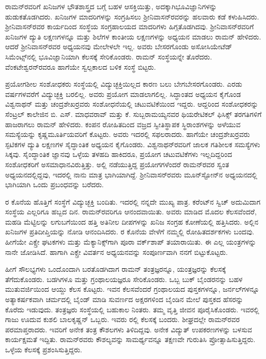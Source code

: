 ರಾಮನ್‍ರವರಿಗೆ ಖನಿಜಗಳ ಭೌತಶಾಸ್ತ್ರದ ಬಗ್ಗೆ ಬಹಳ ಆಸಕ್ತಿಯಿತ್ತು, ಅದಕ್ಕಾಗಿ\break ಭೂವಿಜ್ಞಾನಿಗಳನ್ನು ಹುಡುಕತೊಡಗಿದರು. ಖನಿಜಗಳ ಮಾದರಿಗಳನ್ನು ಸಂಗ್ರಹಿಸಲು ಶ‍್ರೀನಿವಾಸನ್‍\-ರವರನ್ನು ಹಲವಾರು ಕಡೆ ಕಳುಹಿಸಿದರು. ಶ‍್ರೀನಿವಾಸನ್‍ರವರ ಕಾರ್ಯದಿಂದ ಸಂಸ್ಥೆಯ ಸಂಗ್ರಹಾಲಯದ ಮಾದರಿಗಳು ಹಿಗ್ಗತೊಡಗಿದವು. ಶ‍್ರೀನಿವಾಸನ್‍ರವರಿಗೆ ಖನಿಜಗಳ ದ್ಯುತಿ ಲಕ್ಷಣಗಳನ್ನೂ ಮತ್ತು ಶಿಲೆಗಳ ಕಾಂತೀಯ ಲಕ್ಷಣಗಳನ್ನು ಅಧ್ಯಯನ ಮಾಡಲು ರಾಮನ್ ಹೇಳಿದರು. ಆದರೆ ಶ‍್ರೀನಿವಾಸನ್‍ರವರ ಅಧ್ಯಯನವು ಮೇಲೇಳಲೇ ಇಲ್ಲ. ಅವರು ಬೇಸರಗೊಂಡು ಅಸೋಸಿಯೇಟೆಡ್ ಸಿಮೆಂಟ್ಸ್‌ನಲ್ಲಿ ಭೂವಿಜ್ಞಾನಿಯಾಗಿ ಕೆಲಸಕ್ಕೆ ಸೇರಿಕೊಂಡರು. ರಾಮನ್ ಸಂಸ್ಥೆಯನ್ನೇ ತೊರೆದರು. ವೆಂಕಟೇಶ್ವರನ್‍ರವರೂ ಹಾಗೆಯೇ ಸ್ವಲ್ಪಕಾಲದ ಬಳಿಕ ಸಂಸ್ಥೆ ಬಿಟ್ಟರು.

ಪ್ರಯೋಗಶೀಲ ಸಂಶೋಧಕರು ಸಂಸ್ಥೆಯಲ್ಲಿ ವಿದ್ಯುಚ್ಛಕ್ತಿಯಿಲ್ಲದ ಕಾರಣ ಬಲು ಬೇಗ\break ಬೇಸರಗೊಂಡರು. ಎರಡು ವರ್ಷಗಳವರೆಗೆ ವಿದ್ಯುಚ್ಛಕ್ತಿ ಬರಲಿಲ್ಲ. ಅವರು ಪ್ರಯೋಗ ಮಾಡಲಾಗಲಿಲ್ಲ. ಸಿದ್ಧಾಂತದ ಅಧ್ಯಯನ ಕೈಗೊಂಡ ವಿಶ್ವನಾಥನ್ ಮತ್ತು ಚಂದ್ರಶೇಖರ್‍ರವರು ಸಂಶೋಧನೆಯಲ್ಲಿ ಚಟುವಟಿಕೆಯಿಂದ ಇದ್ದರು. ಆದ್ದರಿಂದ ಸಂಶೋಧಕರನ್ನು ಸೆಂಟ್ರಲ್ ಕಾಲೇಜಿನ ಬಿ. ಎಸ್. ಮಾಧವರಾವ್ ಮತ್ತು ಕೆ. ಸುಬ್ಬರಾಮಯ್ಯನವರ ಥಿಯರೇಟಿಕಲ್ ಫಿಸಿಕ್ಸ್ ತರಗತಿಗಳಿಗೆ ಹಾಜರಾಗಲು ರಾಮನ್ ಹೇಳಿದರು. ಕಂಪನ ರೋಹಿತದಿಂದ ವಜ್ರದ ಸ್ವೀತಿಸ್ಥಾಪಕ ಸ್ಥಿರಾಂಶಗಳನ್ನು ಅಳೆಯುವ ಸಮಸ್ಯೆಯನ್ನು ಕೃಷ್ಣಮೂರ್ತಿಯವರಿಗೆ ಕೊಟ್ಟರು. ಅವರು ಇದರಲ್ಲಿ ಸಫಲರಾದರು. ಹಾಗೆಯೇ ಚಂದ್ರಶೇಖರ್‍ರವರು ಸ್ಫಟಿಕಗಳ ದ್ಯುತಿ ಲಕ್ಷಣಗಳ ಸೈದ್ಧಾಂತಿಕ ಅಧ್ಯಯನ ಕೈಗೊಂಡರು. ವಿಶ್ವನಾಥನ್‍ರವರಿಗೆ ಜಾಲಕ ಗತಿಶೀಲಕ ಸಮಸ್ಯೆಗಳು ಸಿಕ್ಕವು. ಸೈಂದ್ಧಾಂತಿಕ ಜ್ಞಾನವು ಒಳ್ಳೆಯ ತಳಹದಿ ಹಾಕಿದರೂ, ಪ್ರಯೋಗ ಚಟುವಟಿಕೆಗಳು ಇಲ್ಲದಿದ್ದರಿಂದ ಸಂಶೋಧಕರಿಗೆ ಅಸಮಾಧಾನವಿರುತ್ತಿತ್ತು. ಅಲ್ಲಿ ನಡೆಯುತ್ತಿದ್ದ ಪ್ರಯೋಗಗಳೆಂದರೆ ರಾಮನ್‍ರವರ ಸ್ವಂತ ಅಧ್ಯಯನದಲ್ಲಿದ್ದವು, ಇದರಲ್ಲಿ ನಾನು ಮಾತ್ರ ಭಾಗಿಯಾಗಿದ್ದೆ. ಶ‍್ರೀನಿವಾಸನ್‍ರವರು ಮೂನ್‍ಸ್ಟೋನ್‍ನ ಅಧ್ಯಯನದಲ್ಲಿ ಭಾಗಿಯಾಗಿ ಒಂದು ಪ್ರಬಂಧವನ್ನು ಬರೆದರು.

\newpage

ರ ಕೊನೆಯ ಹೊತ್ತಿಗೆ ಸಂಸ್ಥೆಗೆ ವಿದ್ಯುಚ್ಛಕ್ತಿ ಬಂದಿತು. ಇದರಲ್ಲಿ ನನ್ನದೇ ಮುಖ್ಯ ಪಾತ್ರ. ಕರೆಂಟ್‍ನ ಸ್ವಿಚ್ ಅದುಮಿದಾಗ ಸಂಸ್ಥೆಯ ಎಲ್ಲರಿಗೂ ಹಬ್ಬದ ದಿನ. ರಾಮನ್‍ರವರಿಗೂ ಆನಂದವಾಯಿತು. ಅವರು ಮಾಡಿದ ಮೊದಲ ಕೆಲಸವೆಂದರೆ, ಮಹಡಿ ಮೆಟ್ಟಿಲನ್ನು ಲಗುಬಗೆಯಿಂದ ಹತ್ತಿ ಅತಿನೀಲ ದೀಪಗಳನ್ನು ಖನಿಜ ಸಂಗ್ರಹ ಕೋಣೆಯಲ್ಲಿ ಹತ್ತಿಸಿದರು. ಅಲ್ಲಿನ ಖನಿಜಗಳ ಪ್ರತಿದೀಪ್ತಿಯನ್ನು ನೋಡಿ ಆನಂದಿಸಿದರು. ರ ಕೊನೆಯ ವೇಳೆಗೆ ನಮ್ಮಲ್ಲಿ ರೋಹಿತದರ್ಶಕಗಳು ಬಂದವು. ಹೀಗೆಯೇ ಎಕ್ಸ್ರೇ ಘಟಕಗಳು ಮತ್ತು ಮೆಕ್ಯಾನಿಕ್ಸ್‌ಗಾಗಿ ಪೂರಾ ವರ್ಕ್‌ಶಾಪ್ ತಯಾರಾಯಿತು. ಈ ಎಲ್ಲ ಯಂತ್ರಗಳನ್ನು ನಾನೇ ಜೋಡಿಸಿದೆ. ಹಾಗಾಗಿ ಎಕ್ಸ್ರೇ ವಿವರ್ತನ ಅಧ್ಯಯನವನ್ನು ಸಂಪೂರ್ಣವಾಗಿ ನನಗೆ ಬಿಟ್ಟುಕೊಟ್ಟರು.

ಹೀಗೆ ಸೌಲಭ್ಯಗಳು ಒಂದೊಂದಾಗಿ ಬರತೊಡಗಿದಾಗ ರಾಮನ್ ತಂತ್ರಜ್ಞರನ್ನೂ, ಯಂತ್ರಜ್ಞರನ್ನು ಕೆಲಸಕ್ಕೆ ತೆಗೆದುಕೊಂಡರು. ಬಡಗಿಗಳೂ ಮತ್ತು ಗ್ರಂಥಾಲಯಜ್ಞರೂ ಸೇರಿಕೊಂಡರು. ಒಬ್ಬ ಬುಕ್ ಬೈಂಡರನನ್ನು ಬಹಳ ಮುತುವರ್ಜಿಯಿಂದ ಆಯ್ದು ಕೆಲಸ ಕೊಟ್ಟರು. ಇವನ ಕೆಲಸವೆಂದರೆ ಗ್ರಂಥಾಲಯದ ಪುಸ್ತಕಗಳನ್ನೂ, ಜರ್ನಲ್‍ಗಳನ್ನೂ ಅತ್ಯಾಕರ್ಷಕವಾಗಿ ಚರ್ಮದಲ್ಲಿ ಬೈಂಡ್ ಮಾಡಿ ಸುವರ್ಣದ ಅಕ್ಷರಗಳಿಂದ ಬೈಂಡಿನ ಮೇಲೆ ಪುಸ್ತಕದ ಹೆಸರನ್ನು ಕೊರೆದು ಇಡುವುದು. ತಂತ್ರಜ್ಞರು ಸಂಸ್ಥೆಯಲ್ಲಿ ಬಹುಕಾಲ ನಿಂತರು. ತಮ್ಮ ವೃತ್ತಿ ಜೀವನ ಪೂರೈಸಿಕೊಂಡರು. ಇವರಲ್ಲಿ ಗಾಜು ಊದುವ ಕುಶಲಿ ಬಾಲಕೃಷ್ಣನ್ ಒಬ್ಬರು. ಇವರು ರಲ್ಲಿ ಕೆಲಸಕ್ಕೆ ಬಂದರು. ಶೀಘ್ರದಲ್ಲೇ ರಾಮನ್‍ರವರ ಪರಮಾಪ್ತರಾದರು. ಇವರಿಗೆ ಅನೇಕ ತಂತ್ರ ಕೌಶಲಗಳು ತಿಳಿದಿದ್ದವು. ಅನೇಕ ವಿದ್ಯುತ್ ಉಪಕರಣಗಳನ್ನು ಬಳಸುವ ಕಾರ್ಯಕ್ಷಮತೆ ಇದ್ದಿತು. ರಾಮನ್‍ರವರು ಕೌಶಲ್ಯವನ್ನು ಸಾಮರ್ಥ್ಯವನ್ನೂ ತಕ್ಷಣವೇ ಗುರುತಿಸಿ ಪ್ರೋತ್ಸಾಹಿಸುತ್ತಿದ್ದರು. ಒಳ್ಳೆಯ ಕೆಲಸಕ್ಕೆ ಪ್ರಶಂಸಿಸುತ್ತಿದ್ದರು.

